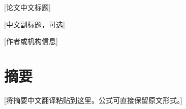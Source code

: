 \begin{center}
{\LARGE [论文中文标题]\par}
\vspace{0.4em}
{\Large [中文副标题，可选]\par}
\vspace{0.8em}
[作者或机构信息]
\end{center}

\section*{摘要}

[将摘要中文翻译粘贴到这里。公式可直接保留原文形式。]


\tableofcontents
\clearpage
